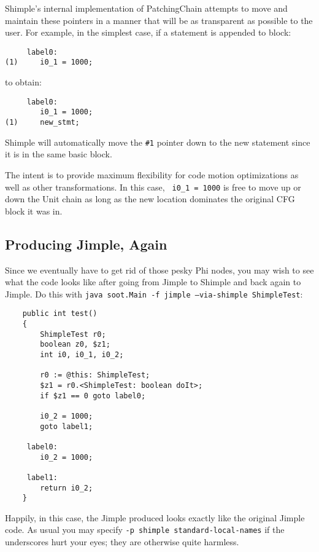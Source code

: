\documentclass[10pt,letterpaper,oneside,onecolumn]{article}
\begin{document}
Shimple's internal implementation of PatchingChain attempts to move
and maintain these pointers in a manner that will be as transparent as
possible to the user.  For example, in the simplest case, if a
statement is appended to block:

\begin{verbatim}
     label0:
(1)     i0_1 = 1000;
\end{verbatim}

to obtain:

\begin{verbatim}
     label0:
        i0_1 = 1000;
(1)     new_stmt;
\end{verbatim}

Shimple will automatically move the {\tt \#1} pointer down to the new
statement since it is in the same basic block.

The intent is to provide maximum flexibility for code motion
optimizations as well as other transformations.  In this case, {\tt
i0\_1 = 1000} is free to move up or down the Unit chain as long as the
new location dominates the original CFG block it was in.

\subsection{Producing Jimple, Again}

Since we eventually have to get rid of those pesky Phi nodes, you
may wish to see what the code looks like after going from Jimple to
Shimple and back again to Jimple.  Do this with {\tt java soot.Main -f
jimple --via-shimple ShimpleTest}:

\begin{verbatim}
    public int test()
    {
        ShimpleTest r0;
        boolean z0, $z1;
        int i0, i0_1, i0_2;

        r0 := @this: ShimpleTest;
        $z1 = r0.<ShimpleTest: boolean doIt>;
        if $z1 == 0 goto label0;

        i0_2 = 1000;
        goto label1;

     label0:
        i0_2 = 1000;

     label1:
        return i0_2;
    }
\end{verbatim}

Happily, in this case, the Jimple produced looks exactly like the
original Jimple code.  As usual you may specify {\tt -p shimple
standard-local-names} if the underscores hurt your eyes; they are
otherwise quite harmless.
\end{document}
